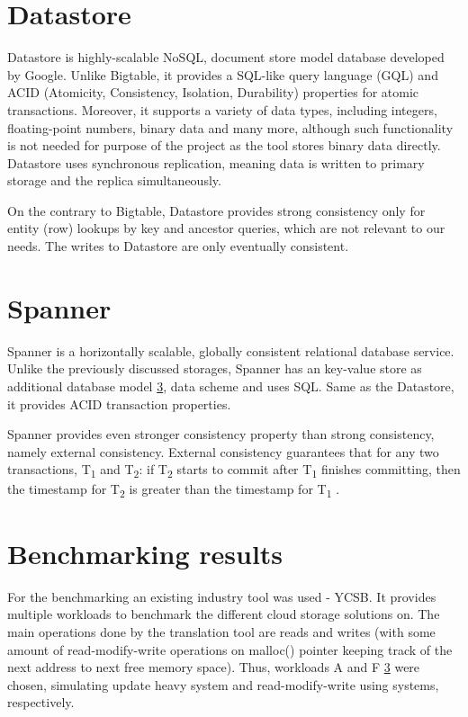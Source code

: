 \documentclass[bsc,frontabs,twoside,singlespacing,parskip,deptreport]{infthesis}     %
\begin{document}
\section{Datastore}

Datastore is highly-scalable NoSQL, document store model database developed by Google. Unlike Bigtable, it provides a SQL-like query language (GQL) and ACID (Atomicity, Consistency, Isolation, Durability) properties for atomic transactions. Moreover, it supports a variety of data types, including integers, floating-point numbers, binary data and many more, although such functionality is not needed for purpose of the project as the tool stores binary data directly. Datastore uses synchronous replication, meaning data is written to primary storage and the replica simultaneously.

On the contrary to Bigtable, Datastore provides strong consistency only for entity (row) lookups by key and ancestor queries, which are not relevant to our needs. The writes to Datastore are only eventually consistent. 

\section{Spanner}

Spanner is a horizontally scalable, globally consistent relational database service. Unlike the previously discussed storages, Spanner has an key-value store as additional database model \ref{}, data scheme and uses SQL. Same as the Datastore, it provides ACID transaction properties.

Spanner provides even stronger consistency property than strong consistency, namely external consistency. External consistency guarantees that for any two transactions, T\textsubscript{1} and T\textsubscript{2}: if T\textsubscript{2} starts to commit after T\textsubscript{1} finishes committing, then the timestamp for T\textsubscript{2} is greater than the timestamp for T\textsubscript{1} . 


\section{Benchmarking results}

For the benchmarking an existing industry tool was used - YCSB. It provides multiple workloads to benchmark the different cloud storage solutions on. The main operations done by the translation tool are reads and writes (with some amount of read-modify-write operations on malloc() pointer keeping track of the next address to next free memory space). Thus, workloads A and F \ref{} were chosen, simulating update heavy system and read-modify-write using systems, respectively.
\end{document}
